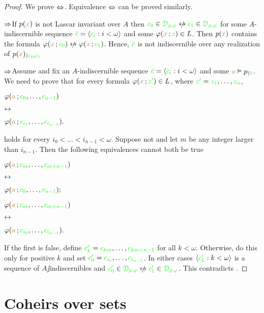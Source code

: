 \documentclass[creche.tex]{subfiles}
\begin{document}
\begin{proof} We prove $\Leftrightarrow$. Equivalence  $\Leftrightarrow$ can be proved similarly.

  \def\ceq#1#2#3{\parbox[t]{30ex}{$\displaystyle #1$}\parbox[t]{5ex}{$\displaystyle\hfil #2$}{$\displaystyle #3$}}
  $\Rightarrow$\quad If $p({\color{brown} x})$ is not Lascar invariant over $A$ then ${\gr c_0}\in{\gr\D_{p,\phi}}\niff {\gr c_1}\in{\gr\D_{p,\phi}}$ for some $A$-indiscernible sequence ${\color{green}\bar c}=\langle{\color{green}c_i}:i<\omega\rangle$ and some $\varphi({\color{brown} x}\,;{\color{green} z})\in L$. Then $p({\color{brown} x})$ contains the formula $\phi({\mr x}\,;{\gr c_0})\niff \phi({\mr x}\,;{\gr c_1})$. Hence, ${\color{green}\bar c}$ is not indiscernible over any realization of $p({\color{brown} x})_{\restriction{\color{green}c_0},{\color{green} c_1}}$ 
  
  $\Rightarrow$\quad Assume  and fix an $A$-indiscernible sequence ${\color{green}\bar c}=\langle{\color{green}c_i}:i<\omega\rangle$ and some ${\color{brown} a}\vDash p_{\restriction{\color{green}\bar c}}$. We need to prove that for every formula $\varphi({\color{brown} x}\,;{\color{green} z'})\in L$, where ${\color{green} z'}={\color{green} z_1},\dots,{\color{green} z_n}$,

  \ceq{\hfill\phi({\mr a}\,;{\gr c_{0}},\dots,{\gr c_{n-1}})}{\iff}{\phi({\mr a}\,;{\gr c_{i_1}},\dots,{\gr c_{i_{n-1}}}).}

  holds for every $i_0<\dots<i_{n-1}<\omega$. Suppose not and let $m$ be any integer larger than $i_{n-1}$. Then the following equivalences cannot both be true

  \ceq{\hfill\phi({\mr a}\,;{\gr c_m},\dots,{\gr c_{m+n-1}})}{\iff}{\phi({\mr a}\,;{\gr c_0},\dots,{\gr c_{n-1}});}


  \ceq{\hfill\phi({\mr a}\,;{\gr c_m},\dots,{\gr c_{m+n-1}})}{\iff}{\phi({\mr a}\,;{\gr c_{i_0}},\dots,{\gr c_{i_{n-1}}}).}

  If the first is false, define ${\color{green} c'_k}={\color{green} c_{km}},\dots,{\color{green} c_{km+n-1}}$ for all $k<\omega$. Otherwise, do this only for positive $k$ and set ${\color{green} c'_0}={\color{green} c_{i_0}},\dots,{\color{green} c_{i_{n-1}}}$. In either cases $\langle{\color{green}c'_k}:k<\omega\rangle$ is a sequence of $A\jj$in\-dis\-cern\-i\-bles and ${\gr c'_0}\in{\gr\D_{p,\phi}}\niff {\gr c'_1}\in{\gr\D_{p,\phi}}$. This contradicts .
\end{proof}

\section{Coheirs over sets}\label{coheirs_sets}
\end{document}
